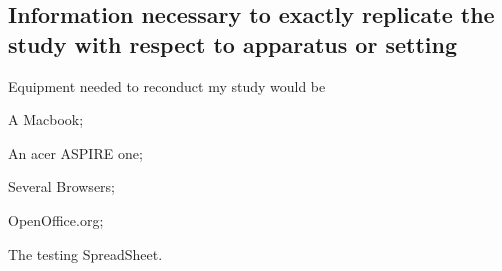 \documentclass[12pt,oneside,letterpaper,titlepage]{article}
\begin{document}

\subsection{Information necessary to exactly replicate the study with respect to apparatus or setting}

Equipment needed to reconduct my study would be
\begin{inparaenum}[(1)]
\item A Macbook;
\item An acer ASPIRE one;
\item Several Browsers;
\item OpenOffice.org;
\item The testing SpreadSheet.
\end{inparaenum}
\end{document}
